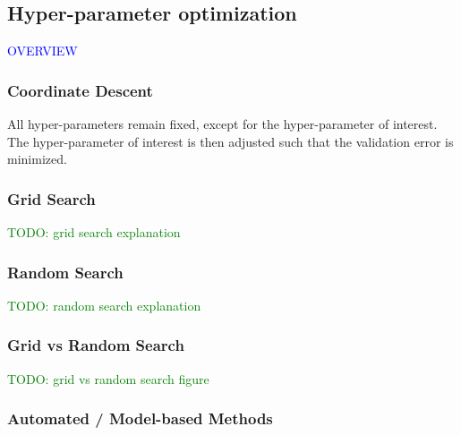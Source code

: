 \subsection{Hyper-parameter optimization}

\textcolor{blue}{OVERVIEW}

\subsubsection{Coordinate Descent}

All hyper-parameters remain fixed, except for the hyper-parameter of interest. The hyper-parameter of interest is then adjusted such that the validation error is minimized.

\subsubsection{Grid Search}

\textcolor{green}{TODO: grid search explanation}

\subsubsection{Random Search}

\textcolor{green}{TODO: random search explanation}

\subsubsection{Grid vs Random Search}

\textcolor{green}{TODO: grid vs random search figure}

\subsubsection{Automated / Model-based Methods}